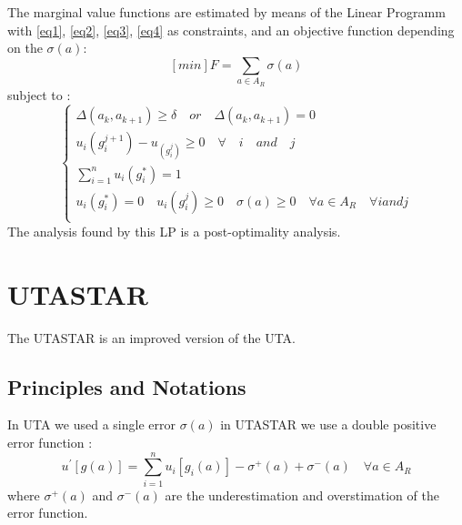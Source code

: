 \documentclass{report}
\begin{document}
The marginal value functions are estimated by means of the Linear Programm with \eqref{eq1}, \eqref{eq2}, \eqref{eq3}, \eqref{eq4} as constraints, and an objective function depending on the $\sigma(a)$: 
$$ [min]F = \sum_{a \in A_R} \sigma(a)  $$
subject to : \\
\begin{equation}
      \begin{cases}
      	\Delta (a_k, a_{k+1} ) \geq \delta \quad or \quad \Delta (a_k, a_{k+1} ) = 0 \\
       	u_i (g_i^{j+1}) - u_(g_i^{j}) \geq 0 \quad \forall \quad i \quad and \quad j\\
       	\sum_{i=1}^{n} u_i(g_{i}^{*}) = 1\\
	u_i (g_i^{*}) = 0 \quad  u_i(g_i^{j}) \geq 0 \quad  \sigma(a) \geq 0 \quad  \forall a \in A_R\quad  \forall i and j\\
      \end{cases}
\end{equation}
The analysis found by this LP is a post-optimality analysis. 
\newpage
\section{UTASTAR}
The UTASTAR is an improved version of the UTA. 
\subsection{Principles and Notations}
In UTA we used a single error $\sigma(a)$ in UTASTAR we use a double positive error function : 
\begin{equation}
	u^{'} [g(a)] = \sum_{i=1}^{n} u_i [g_i (a)] - \sigma ^{+} (a)+ \sigma ^{-} (a) \quad  \forall a \in A_R
\end{equation}
where $\sigma ^{+} (a)$ and $\sigma ^{-} (a)$ are the underestimation and overstimation of the error function.\\ 
\end{document}
